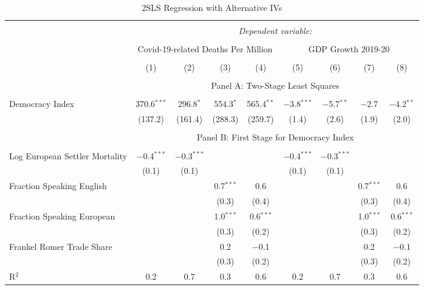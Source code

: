 \begin{landscape}
\begin{table}[!htbp] \centering 
  \caption{2SLS Regression with Alternative IVs} 
  \label{tab:2sls-instruments} 
  \begin{threeparttable}
\begin{tabular}{@{\extracolsep{0pt}}lcccccccc} 
\\[-1.8ex]\hline 
\hline \\[-1.8ex] 
 & \multicolumn{8}{c}{\textit{Dependent variable:}} \\ 
\cline{2-9} 
\\[-1.8ex] & \multicolumn{4}{c}{Covid-19-related Deaths Per Million} & \multicolumn{4}{c}{GDP Growth 2019-20} \\ 
\\[-1.8ex] & (1) & (2) & (3) & (4) & (5) & (6) & (7) & (8)\\ 
\hline \\[-1.8ex] 
  & \multicolumn{8}{c}{Panel A: Two-Stage Least Squares} \\ \\
 Democracy Index & 370.6$^{***}$ & 296.8$^{*}$ & 554.3$^{*}$ & 565.4$^{**}$ & $-$3.8$^{***}$ & $-$5.7$^{**}$ & $-$2.7 & $-$4.2$^{**}$ \\ 
  & (137.2) & (161.4) & (288.3) & (259.7) & (1.4) & (2.6) & (1.9) & (2.0) \\ 
 \hline \\[-1.8ex] 
   & \multicolumn{8}{c}{Panel B: First Stage for Democracy Index} \\ \\
Log European Settler Mortality & $-$0.4$^{***}$ & $-$0.3$^{***}$ &  &  & $-$0.4$^{***}$ & $-$0.3$^{***}$ &  &  \\ 
  & (0.1) & (0.1) &  &  & (0.1) & (0.1) &  &  \\ 
  Fraction Speaking English &  &  & 0.7$^{***}$ & 0.6 &  &  & 0.7$^{***}$ & 0.6 \\ 
  &  &  & (0.3) & (0.4) &  &  & (0.3) & (0.4) \\ 
  Fraction Speaking European &  &  & 1.0$^{***}$ & 0.6$^{***}$ &  &  & 1.0$^{***}$ & 0.6$^{***}$ \\ 
  &  &  & (0.3) & (0.2) &  &  & (0.3) & (0.2) \\ 
  Frankel Romer Trade Share &  &  & 0.2 & $-$0.1 &  &  & 0.2 & $-$0.1 \\ 
  &  &  & (0.3) & (0.2) &  &  & (0.3) & (0.2) \\ 
  R$^{2}$ & 0.2 & 0.7 & 0.3 & 0.6 & 0.2 & 0.7 & 0.3 & 0.6 \\ 

\end{tabular}
\end{threeparttable}
\end{table}
\end{landscape}
